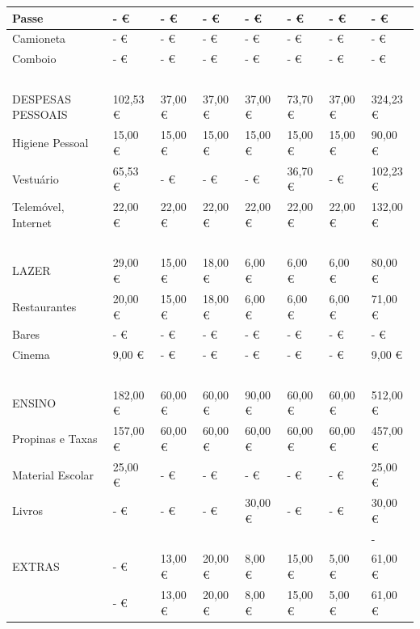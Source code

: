 \documentclass[a4paper,11pt]{article}
\begin{document}
\begin{table}[H]
\begin{center}
\begin{tabular}{|l|l|l|l|l|l|l|l|}
        Passe &  -    €  &  -    €  &  -    €  &  -    €  &  -    €  &  -    €  &  -    €  \\ \hline
        Camioneta &  -    €  &  -    €  &  -    €  &  -    €  &  -    €  &  -    €  &  -    €  \\ \hline
        Comboio &  -    €  &  -    €  &  -    €  &  -    €  &  -    €  &  -    €  &  -    €  \\ \hline
        ~ & ~ & ~ & ~ & ~ & ~ & ~ & ~ \\ \hline
        DESPESAS PESSOAIS &  102,53  €  &  37,00  €  &  37,00  €  &  37,00  €  &  73,70  €  &  37,00  €  &  324,23  €  \\ \hline
        Higiene Pessoal &  15,00  €  &  15,00  €  &  15,00  €  &  15,00  €  &  15,00  €  &  15,00  €  &  90,00  €  \\ \hline
        Vestuário &  65,53  €  &  -    €  &  -    €  &  -    €  &  36,70  €  &  -    €  &  102,23  €  \\ \hline
        Telemóvel, Internet &  22,00  €  &  22,00  €  &  22,00  €  &  22,00  €  &  22,00  €  &  22,00  €  &  132,00  €  \\ \hline
        ~ & ~ & ~ & ~ & ~ & ~ & ~ & ~ \\ \hline
        LAZER &  29,00  €  &  15,00  €  &  18,00  €  &  6,00  €  &  6,00  €  &  6,00  €  &  80,00  €  \\ \hline
        Restaurantes &  20,00  €  &  15,00  €  &  18,00  €  &  6,00  €  &  6,00  €  &  6,00  €  &  71,00  €  \\ \hline
        Bares &  -    €  &  -    €  &  -    €  &  -    €  &  -    €  &  -    €  &  -    €  \\ \hline
        Cinema &  9,00  €  &  -    €  &  -    €  &  -    €  &  -    €  &  -    €  &  9,00  €  \\ \hline
        ~ & ~ & ~ & ~ & ~ & ~ & ~ & ~ \\ \hline
        ENSINO &  182,00  €  &  60,00  €  &  60,00  €  &  90,00  €  &  60,00  €  &  60,00  €  &  512,00  €  \\ \hline
        Propinas e Taxas &  157,00  €  &  60,00  €  &  60,00  €  &  60,00  €  &  60,00  €  &  60,00  €  &  457,00  €  \\ \hline
        Material Escolar &  25,00  €  &  -    €  &  -    €  &  -    €  &  -    €  &  -    €  &  25,00  €  \\ \hline
        Livros &  -    €  &  -    €  &  -    €  &  30,00  €  &  -    €  &  -    €  &  30,00  €  \\ \hline
        ~ & ~ & ~ & ~ & ~ & ~ & ~ & - \\ \hline
        EXTRAS &  -    €  &  13,00  €  &  20,00  €  &  8,00  €  &  15,00  €  &  5,00  €  &  61,00  €  \\ \hline
        ~ &  -    €  &  13,00  €  &  20,00  €  &  8,00  €  &  15,00  €  &  5,00  €  &  61,00  € \\ \hline
    \end{tabular}
    \label{tabela planeamento}
    \end{center}
\end{table}
\end{document}
